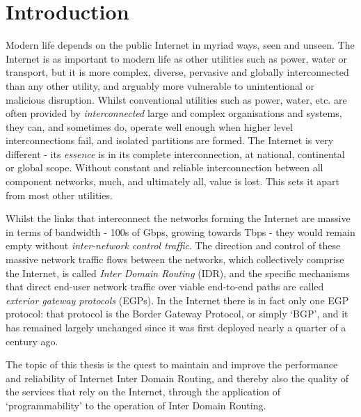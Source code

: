 \chapter{Introduction}
\thispagestyle{empty} %

Modern life depends on the public Internet in myriad ways, seen and unseen.
The Internet is as important to modern life as other utilities such as power, water or transport, but it is more complex, diverse, pervasive and globally interconnected than any other utility, and arguably more vulnerable to unintentional or malicious disruption.
Whilst conventional utilities such as power, water, etc. are often provided by \emph{interconnected} large and complex organisations and systems, they can, and sometimes do, operate well enough when higher level interconnections fail, and isolated partitions are formed.
The Internet is very different - its \emph{essence} is in its complete interconnection, at national, continental or global scope.
Without constant and reliable interconnection between all component networks, much, and ultimately all, value is lost.
This sets it apart from most other utilities.
\medskip

Whilst the links that interconnect the networks forming the Internet are massive in terms of bandwidth - 100s of Gbps, growing towards Tbps - they would remain empty without \emph{inter-network control traffic}.
The direction and control of these massive network traffic flows between the networks, which collectively comprise the Internet, is called \emph{Inter Domain Routing} (IDR), and the specific mechanisms that direct end-user network traffic over viable end-to-end paths are called \emph{exterior gateway protocols} (EGPs).
In the Internet there is in fact only one EGP protocol: that protocol is the Border Gateway Protocol, or simply ‘BGP’, and it has remained largely unchanged since it was first deployed nearly a quarter of a century ago.
\medskip

The topic of this thesis is the quest to maintain and improve the performance and reliability of Internet Inter Domain Routing, and thereby also the quality of the services that rely on the Internet, through the application of ‘programmability’ to the operation of Inter Domain Routing.
\medskip

